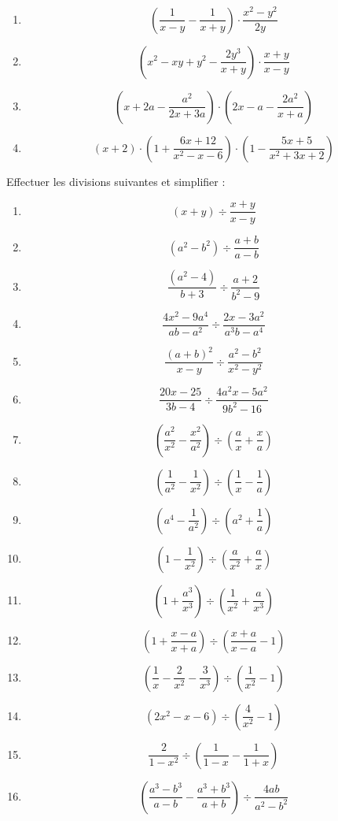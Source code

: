 \begin{exercice}
\begin{multicols}{2}
\begin{enumerate}
\item $$\left( \frac{1}{x-y}-\frac{1}{x+y} \right)\cdot \frac{{{x}^{2}}-{{y}^{2}}}{2y}$$
\item $$\left( {{x}^{2}}-xy+{{y}^{2}}-\frac{2{{y}^{3}}}{x+y} \right)\cdot \frac{x+y}{x-y}$$
\item $$\left( x+2a-\frac{{{a}^{2}}}{2x+3a} \right)\cdot \left( 2x-a-\frac{2{{a}^{2}}}{x+a} \right)$$
\item $$(x+2)\cdot \left( 1+\frac{6x+12}{{{x}^{2}}-x-6} \right)\cdot \left( 1-\frac{5x+5}{{{x}^{2}}+3x+2} \right)$$ 
\end{enumerate}
\end{multicols}
\end{exercice}

\begin{exercice}
Effectuer les divisions suivantes et simplifier : 
\begin{multicols}{2}
\begin{enumerate}
\item $$(x+y)\div \frac{x+y}{x-y}$$
\item $$({{a}^{2}}-{{b}^{2}})\div \frac{a+b}{a-b}$$
\item $$\frac{({{a}^{2}}-4)}{b+3}\div \frac{a+2}{{{b}^{2}}-9}$$
\item $$\frac{4{{x}^{2}}-9{{a}^{4}}}{ab-{{a}^{2}}}\div \frac{2x-3{{a}^{2}}}{{{a}^{3}}b-{{a}^{4}}}$$
\item $$\frac{{{(a+b)}^{2}}}{x-y}\div \frac{{{a}^{2}}-{{b}^{2}}}{{{x}^{2}}-{{y}^{2}}}$$
\item $$\frac{20x-25}{3b-4}\div \frac{4{{a}^{2}}x-5{{a}^{2}}}{9{{b}^{2}}-16}$$
\item $$\left( \frac{{{a}^{2}}}{{{x}^{2}}}-\frac{{{x}^{2}}}{{{a}^{2}}} \right)\div \left( \frac{a}{x}+\frac{x}{a} \right)$$
\item $$\left( \frac{1}{{{a}^{2}}}-\frac{1}{{{x}^{2}}} \right)\div \left( \frac{1}{x}-\frac{1}{a} \right)$$
\item $$\left( {{a}^{4}}-\frac{1}{{{a}^{2}}} \right)\div \left( {{a}^{2}}+\frac{1}{a} \right)$$
\item $$\left( 1-\frac{1}{{{x}^{2}}} \right)\div \left( \frac{a}{{{x}^{2}}}+\frac{a}{x} \right)$$
\item $$\left( 1+\frac{{{a}^{3}}}{{{x}^{3}}} \right)\div \left( \frac{1}{{{x}^{2}}}+\frac{a}{{{x}^{3}}} \right)$$
\item $$\left( 1+\frac{x-a}{x+a} \right)\div \left( \frac{x+a}{x-a}-1 \right)$$
\item $$\left( \frac{1}{x}-\frac{2}{{{x}^{2}}}-\frac{3}{{{x}^{3}}} \right)\div \left( \frac{1}{{{x}^{2}}}-1 \right)$$
\item $$\left( 2{{x}^{2}}-x-6 \right)\div \left( \frac{4}{{{x}^{2}}}-1 \right)$$
\item $$\frac{2}{1-{{x}^{2}}}\div \left( \frac{1}{1-x}-\frac{1}{1+x} \right)$$
\item $$\left( \frac{{{a}^{3}}-{{b}^{3}}}{a-b}-\frac{{{a}^{3}}+{{b}^{3}}}{a+b} \right)\div \frac{4ab}{{{a}^{2}}-{{b}^{2}}}$$ 
\end{enumerate}
\end{multicols}
\end{exercice}

